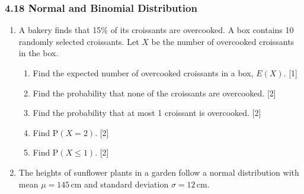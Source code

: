\documentclass[12pt, twoside]{article}
\begin{document}
\subsubsection*{4.18 Normal and Binomial Distribution}

\begin{enumerate}[itemsep=0.15cm]

\item A bakery finds that 15\% of its croissants are overcooked.
      A box contains 10 randomly selected croissants.
      Let $X$ be the number of overcooked croissants in the box.

\begin{center}
\vspace{-0.3cm}
\vspace{-0.3cm}
\end{center}

\begin{enumerate}[itemsep=0.1cm]
  \item Find the expected number of overcooked croissants in a box, $E(X)$. \hfill [1]
  \item Find the probability that none of the croissants are overcooked. \hfill [2]
   \item Find the probability that at most 1 croissant is overcooked. \hfill [2]
  \item Find $\mathrm{P}(X = 2)$. \hfill [2]
  \item Find $\mathrm{P}(X \leq 1)$. \hfill [2]
\end{enumerate}

\vfill

\item The heights of sunflower plants in a garden follow a normal distribution
      with mean $\mu = 145$\,cm and standard deviation $\sigma = 12$\,cm.
\vspace{0.5cm}


\end{enumerate}
\end{document}
